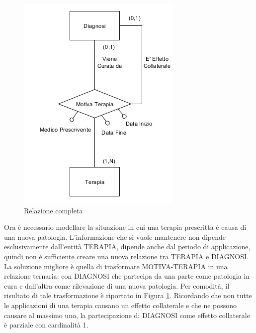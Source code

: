 \documentclass{article}
\begin{document}
\begin{figure}[!ht]
\begin{minipage}{.5\textwidth}
    \includegraphics[width=\linewidth]{piccolo2}
    \caption{Relazione completa}
    \label{schema_piccolo2}
  \end{minipage}
\end{figure}

Ora è necessario modellare la situazione in cui una terapia prescritta è causa
di una nuova patologia.  L'informazione che si vuole mantenere non dipende
esclusivamente dall'entità TERAPIA, dipende anche dal periodo di applicazione,
quindi non è sufficiente creare una nuova relazione tra TERAPIA e DIAGNOSI.  La
soluzione migliore è quella di trasformare MOTIVA-TERAPIA in una relazione
ternaria: con DIAGNOSI che partecipa da una parte come patologia in cura e
dall'altra come rilevazione di una nuova patologia.  Per comodità, il risultato
di tale trasformazione è riportato in Figura \ref{schema_piccolo2}.  Ricordando
che non tutte le applicazioni di una terapia causano un effetto collaterale e
che ne possono causare al massimo uno, la partecipazione di DIAGNOSI come
effetto collaterale è parziale con cardinalità 1.
\end{document}
